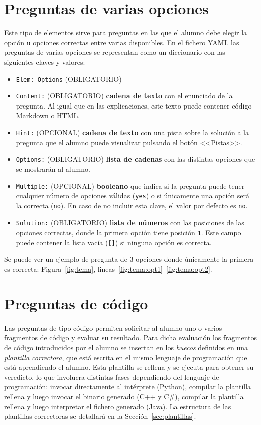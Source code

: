 \documentclass[]{article}
\newcommand{\code}[1]{{\lstinline[basicstyle=\ttfamily,mathescape]!#1!}}
\begin{document}
\section{Preguntas de varias opciones}
Este tipo de elementos sirve para preguntas en las que el alumno debe elegir la opción u opciones correctas entre varias disponibles. En el fichero YAML las preguntas de varias opciones se representan como un diccionario con las siguientes claves y valores:
\begin{itemize}
	\item \code{Elem: Options} {\sf (OBLIGATORIO)}
	\item \code{Content:} {\sf (OBLIGATORIO)} \textbf{cadena de texto} con el enunciado de la pregunta. Al igual que en las explicaciones, este texto puede contener código Markdown o HTML. 
 	\item \code{Hint:} {\sf (OPCIONAL)} \textbf{cadena de texto} con una pista sobre la solución a la pregunta que el alumno puede visualizar pulsando el botón <<Pistas>>.
 	\item \code{Options:} {\sf (OBLIGATORIO)} \textbf{lista de cadenas} con las distintas opciones que se mostrarán al alumno.
 	\item \code{Multiple:} {\sf (OPCIONAL)} \textbf{booleano} que indica si la pregunta puede tener cualquier número de opciones válidas (\code{yes}) o si únicamente una opción será la correcta (\code{no}). En caso de no incluir esta clave, el valor por defecto es \code{no}.
 	\item \code{Solution:} {\sf (OBLIGATORIO)} \textbf{lista de números} con las posiciones de las opciones correctas, donde la primera opción tiene posición \code{1}. Este campo puede contener la lista vacía (\code{[]}) si ninguna opción es correcta.
\end{itemize}
Se puede ver un ejemplo de pregunta de 3 opciones donde únicamente la primera es correcta: Figura~\ref{fig:tema}, lineas~\ref{fig:tema:opt1}--\ref{fig:tema:opt2}.

\section{Preguntas de código}
Las preguntas de tipo código permiten solicitar al alumno uno o varios fragmentos de código y evaluar su resultado. Para dicha evaluación los fragmentos de código introducidos por el alumno se insertan en los \emph{huecos} definidos en una \emph{plantilla correctora}, que está escrita en el mismo lenguaje de programación que está aprendiendo el alumno. Esta plantilla se rellena y se ejecuta para obtener su veredicto, lo que involucra distintas fases dependiendo del lenguaje de programación: invocar directamente al intérprete (Python), compilar la plantilla rellena y luego invocar el binario generado (C++ y C\#), compilar la plantilla rellena y luego interpretar el fichero generado (Java). La estructura de las plantillas correctoras se detallará en la Sección~\ref{sec:plantillas}.
\end{document}
